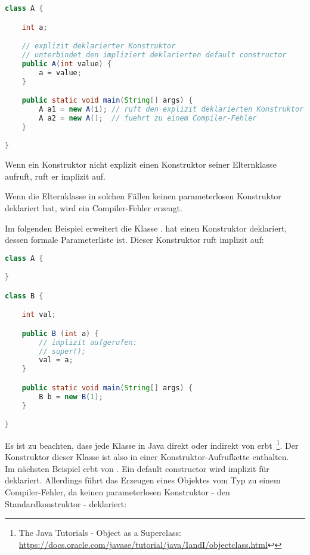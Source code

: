 \begin{lstlisting}[language=java]
class A {

    int a;

    // explizit deklarierter Konstruktor
    // unterbindet den impliziert deklarierten default constructor
    public A(int value) {
        a = value;
    }

    public static void main(String[] args) {
        A a1 = new A(i); // ruft den explizit deklarierten Konstruktor auf
        A a2 = new A();  // fuehrt zu einem Compiler-Fehler
    }

}
\end{lstlisting}

Wenn ein Konstruktor nicht explizit einen Konstruktor seiner Elternklasse aufruft, ruft er implizit  auf.

Wenn die Elternklasse in solchen Fällen keinen parameterlosen Konstruktor deklariert hat, wird ein Compiler-Fehler erzeugt.

Im folgenden Beispiel erweitert  die Klasse .  hat einen Konstruktor deklariert, dessen
formale Parameterliste  ist. Dieser Konstruktor ruft implizit  auf:

\begin{lstlisting}[language=java]
class A {

}

class B {

    int val;

    public B (int a) {
        // implizit aufgerufen:
        // super();
        val = a;
    }

    public static void main(String[] args) {
        B b = new B(1);
    }

}
\end{lstlisting}

Es ist zu beachten, dass jede Klasse in Java direkt oder indirekt von  erbt~\footnote{
    The Java Tutorials - Object as a Superclass: \url{https://docs.oracle.com/javase/tutorial/java/IandI/objectclass.html}↩
}.
Der Konstruktor dieser Klasse ist also in einer Konstruktor-Aufrufkette enthalten.\\

Im nächsten Beispiel erbt   von . Ein default constructor wird implizit für  deklariert. Allerdings
führt das Erzeugen eines Objektes vom Typ  zu einem Compiler-Fehler, da  keinen parameterlosen
Konstruktor - den Standardkonstruktor - deklariert:


